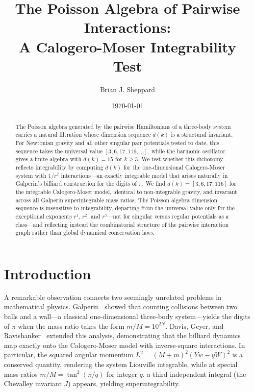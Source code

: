 \documentclass[aps,prl,twocolumn,superscriptaddress,showpacs]{revtex4-2}
\begin{document}
\title{The Poisson Algebra of Pairwise Interactions:\\
A Calogero-Moser Integrability Test}

\author{Brian J. Sheppard}
\affiliation{[Institution]}

\date{\today}

\begin{abstract}
The Poisson algebra generated by the pairwise Hamiltonians of a
three-body system carries a natural filtration whose dimension sequence
$d(k)$ is a structural invariant.  For Newtonian gravity and all other
singular pair potentials tested to date, this sequence takes the
universal value $[3, 6, 17, 116, \ldots]$, while the harmonic
oscillator gives a finite algebra with $d(k) = 15$ for $k \geq 3$.
We test whether this dichotomy reflects integrability by computing
$d(k)$ for the one-dimensional Calogero-Moser system with $1/r^2$
interactions---an exactly integrable model that arises naturally in
Galperin's billiard construction for the digits of $\pi$.  We find
$d(k) = [3, 6, 17, 116]$ for the integrable Calogero-Moser model,
identical to non-integrable gravity, and invariant across all Galperin
superintegrable mass ratios.  The Poisson algebra dimension sequence
is insensitive to integrability, departing from the universal value
only for the exceptional exponents $r^1$, $r^2$, and $r^3$---not for
singular versus regular potentials as a class---and reflecting
instead the combinatorial structure of the pairwise interaction graph
rather than global dynamical conservation laws.
\end{abstract}

\maketitle


\section{Introduction}
\label{sec:intro}

A remarkable observation connects two seemingly unrelated problems in
mathematical physics.  Galperin~\cite{Galperin2003} showed that
counting collisions between two balls and a wall---a classical
one-dimensional three-body system---yields the digits of $\pi$ when the
mass ratio takes the form $m/M = 10^{2N}$.  Davis, Geyer, and
Ravishanker~\cite{Davis2017} extended this analysis, demonstrating that
the billiard dynamics map exactly onto the Calogero-Moser model with
inverse-square interactions.  In particular, the squared angular
momentum $L^2 = (M+m)^2(Yw - yW)^2$ is a conserved quantity, rendering
the system Liouville integrable, while at special mass ratios
$m/M = \tan^2(\pi/q)$ for integer $q$, a third independent integral
(the Chevalley invariant $J$) appears, yielding superintegrability.
\end{document}
